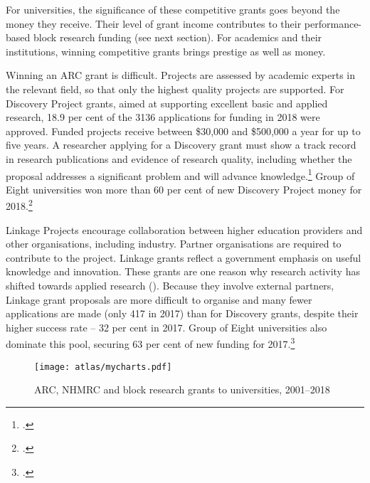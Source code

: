 \documentclass{grattan}
\begin{document}
For universities, the significance of these competitive grants goes beyond the money they receive. Their level of grant income contributes to their performance-based block research funding (see next section). For academics and their institutions, winning competitive grants brings prestige as well as money.

Winning an ARC grant is difficult. Projects are assessed by academic experts in the relevant field, so that only the highest quality projects are supported. For Discovery Project grants, aimed at supporting excellent basic and applied research, 18.9 per cent of the 3136 applications for funding in 2018 were approved. Funded projects receive between \$30,000 and \$500,000 a year for up to five years. A researcher applying for a Discovery grant must show a track record in research publications and evidence of research quality, including whether the proposal addresses a significant problem and will advance knowledge.\footcite[][]{ARC2017fundingrulesfors} Group of Eight universities won more than 60 per cent of new Discovery Project money for 2018.\footcite[][]{ARC2018selectionreportd}

Linkage Projects encourage collaboration between higher education providers and other organisations, including industry. Partner organisations are required to contribute to the project. Linkage grants reflect a government emphasis on useful knowledge and innovation. These grants are one reason why research activity has shifted towards applied research (). Because they involve external partners, Linkage grant proposals are more difficult to organise and many fewer applications are made (only 417 in 2017) than for Discovery grants, despite their higher success rate -- 32 per cent in 2017. Group of Eight universities also dominate this pool, securing 63 per cent of new funding for 2017.\footcite[][]{ARC2018selectionreportl}


    \begin{figure} %
    \caption{ARC, NHMRC and block research grants to universities, 2001--2018}\label{fig:arc-nhmrc-and-block-research-grants-to-universities-20012018}
    \texttt{[image: atlas/mycharts.pdf]}
    \end{figure}
\end{document}
